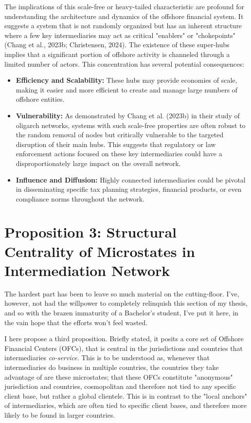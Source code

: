The implications of this scale-free or heavy-tailed characteristic are profound for understanding the architecture and dynamics of the offshore financial system. It suggests a system that is not randomly organized but has an inherent structure where a few key intermediaries may act as critical "enablers" or "chokepoints" (Chang et al., 2023b; Christensen, 2024). The existence of these super-hubs implies that a significant portion of offshore activity is channeled through a limited number of actors. This concentration has several potential consequences:
\begin{itemize}
    \item \textbf{Efficiency and Scalability:} These hubs may provide economies of scale, making it easier and more efficient to create and manage large numbers of offshore entities.
    \item \textbf{Vulnerability:} As demonstrated by Chang et al. (2023b) in their study of oligarch networks, systems with such scale-free properties are often robust to the random removal of nodes but critically vulnerable to the targeted disruption of their main hubs. This suggests that regulatory or law enforcement actions focused on these key intermediaries could have a disproportionately large impact on the overall network.
    \item \textbf{Influence and Diffusion:} Highly connected intermediaries could be pivotal in disseminating specific tax planning strategies, financial products, or even compliance norms throughout the network.
\end{itemize}

\newpage

\section{Proposition 3: Structural Centrality of Microstates in Intermediation Network}

The hardest part has been to leave so much material on the cutting-floor. I've, however, not had the willpower to completely relinquish this section of my thesis, and so with the brazen immaturity of a Bachelor's student, I've put it here, in the vain hope that the efforts won't feel wasted. 

I here propose a third proposition. Briefly stated, it posits a core set of Offshore Financial Centers (OFCs), that is central in the jurisdictions and countries that intermediaries \textit{co-service}. This is to be understood as, whenever that intermediaries do business in multiple countries, the countries they take advantage of are these microstates; that these OFCs constitute "anonymous" jurisdiction and countries, cosmopolitan and therefore not tied to any specific client base, but rather a global clientele. This is in contrast to the "local anchors" of intermediaries, which are often tied to specific client bases, and therefore more likely to be found in larger countries.


